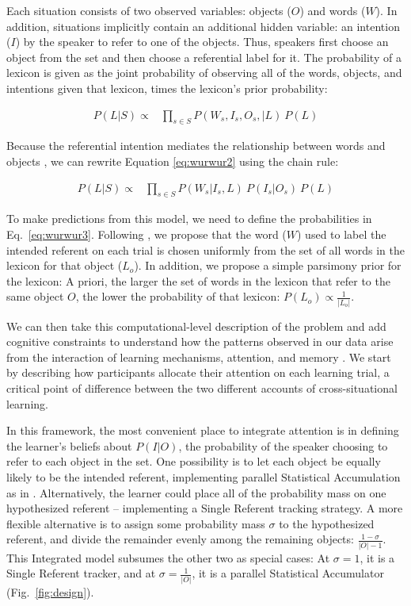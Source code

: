 \documentclass{pnastwo}
\begin{document}
\begin{article}
\noindent Each situation consists of two observed variables: objects ($O$) and words ($W$). In addition, situations implicitly contain an additional hidden variable: an intention ($I$) by the speaker to refer to one of the objects. Thus, speakers first choose an object from the set and then choose a referential label for it. The probability of a lexicon is given as the joint probability of observing all of the words, objects, and intentions given that lexicon, times the lexicon's prior probability:

\begin{align}
P(L|S) \propto & \prod\limits_{s\in{S}}P(W_{s},I_{s}, O_{s},|L) \: P(L) \label{eq:wurwur2}
\end{align}

\noindent Because the referential intention mediates the relationship between words and objects \citep{Frank2009a}, we can rewrite Equation \ref{eq:wurwur2} using the chain rule:

\begin{align}
P(L|S) \propto & \prod\limits_{s\in{S}}P(W_{s}| I_{s}, L) \: P(I_{s}|O_{s})  \: P(L) \label{eq:wurwur3}
\end{align}

To make predictions from this model, we need to define the probabilities in Eq.~\ref{eq:wurwur3}. Following \citep{Frank2009a}, we propose that the word ($W$) used to label the intended referent on each trial is chosen uniformly from the set of all words in the lexicon for that object ($L_{o}$). In addition, we propose a simple parsimony prior for the lexicon: A priori, the larger the set of words in the lexicon that refer to the same object $O$, the lower the probability of that lexicon: $P(L_{o}) \propto \frac{1}{|L_{o}|}$. 

We can then take this computational-level description of the problem and add cognitive constraints to understand how the patterns observed in our data arise from the interaction of learning mechanisms, attention, and memory \citep[see e.g.,][]{Frank2010a, Shi2010}. We start by describing how participants allocate their attention on each learning trial, a critical point of difference between the two different accounts of cross-situational learning. 

In this framework, the most convenient place to integrate attention is in defining the learner's beliefs about $P(I|O)$, the probability of the speaker choosing to refer to each object in the set. One possibility is to let each object be equally likely to be the intended referent, implementing parallel Statistical Accumulation as in \citep{Frank2009a}. Alternatively, the learner could place all of the probability mass on one hypothesized referent -- implementing a Single Referent tracking strategy. A more flexible alternative is to assign some probability mass $\sigma$ to the hypothesized referent, and divide the remainder evenly among the remaining objects: $\frac{1-\sigma}{|O|-1}$. This Integrated model subsumes the other two as special cases: At $\sigma=1$, it is a Single Referent tracker, and at $\sigma=\frac{1}{|O|}$, it is a parallel Statistical Accumulator (Fig.~\ref{fig:design}). 


\end{article}
\end{document}
